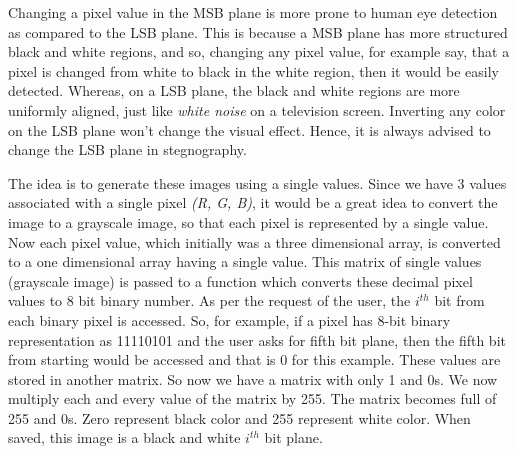 \documentclass{report}
\begin{document}
Changing a pixel value in the MSB plane is more prone to human eye detection as compared to the LSB plane. This is because a MSB plane has more structured black and white regions, and so, changing any pixel value, for example say, that a pixel is changed from white to black in the white region, then it would be easily detected. Whereas, on a LSB plane, the black and white regions are more uniformly aligned, just like {\it white noise} on a television screen. Inverting any color on the LSB plane won't change the visual effect. Hence, it is always advised to change the LSB plane in stegnography.
\par The idea is to generate these images using a single values. Since we have 3 values associated with a single pixel {\it (R, G, B)}, it would be a great idea to convert the image to a grayscale image, so that each pixel is represented by a single value. Now each pixel value, which initially was a three dimensional array, is converted to a one dimensional array having a single value. This matrix of single values (grayscale image) is passed to a function which converts these decimal pixel values to 8 bit binary number. As per the request of the user, the $i^{th}$ bit from each binary pixel is accessed. So, for example, if a pixel has 8-bit binary representation as 11110101 and the user asks for fifth bit plane, then the fifth bit from starting would be accessed and that is 0 for this example. These values are stored in another matrix. So now we have a matrix with only 1 and 0s. We now multiply each and every value of the matrix by 255. The matrix becomes full of 255 and 0s. Zero represent black color and 255 represent white color. When saved, this image is a black and white $i^{th}$ bit plane. 
\end{document}
